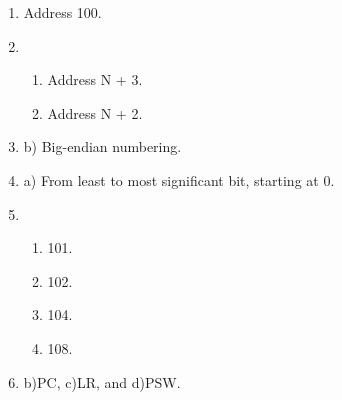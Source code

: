 \documentclass{article}
\begin{document}
\begin{enumerate}
     \item  Address 100.
     \item  \begin{enumerate}
                \item   Address N + 3.
                \item   Address N + 2. 
            \end{enumerate}
     \item  b) Big-endian numbering.
     \item  a) From least to most significant bit, starting at 0.
     \item  \begin{enumerate}
                \item   101.
                \item   102.
                \item   104.
                \item   108.
            \end{enumerate}
     \item  b)PC, c)LR, and d)PSW.
\end{enumerate}
\end{document}
